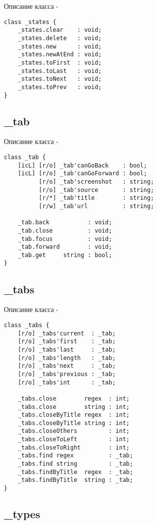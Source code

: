 \noindent Описание класса  -
\begin{lstlisting}[numbers=none]
class _states {
	_states.clear    : void;
	_states.delete   : void;
	_states.new      : void;
	_states.newAtEnd : void;
	_states.toFirst  : void;
	_states.toLast   : void;
	_states.toNext   : void;
	_states.toPrev   : void;
}
\end{lstlisting}

\subsection{{\color{orange} \_tab}}

\noindent Описание класса  -
\begin{lstlisting}[numbers=none]
class _tab {
	[icL] [r/o] _tab'canGoBack    : bool;
	[icL] [r/o] _tab'canGoForward : bool;
	      [r/o] _tab'screenshot   : string;
	      [r/o] _tab'source       : string;
	      [r/*] _tab'title        : string;
	      [r/w] _tab'url          : string;

	_tab.back           : void;
	_tab.close          : void;
	_tab.focus          : void;
	_tab.forward        : void;
	_tab.get     string : bool;
}
\end{lstlisting}

\subsection{{\color{orange} \_tabs}}

\noindent Описание класса  -
\begin{lstlisting}[numbers=none]
class _tabs {
	[r/o] _tabs'current  : _tab;
	[r/o] _tabs'first    : _tab;
	[r/o] _tabs'last     : _tab;
	[r/o] _tabs'length   : _tab;
	[r/o] _tabs'next     : _tab;
	[r/o] _tabs'previous : _tab;
	[r/o] _tabs'int      : _tab;
	
	_tabs.close        regex  : int;
	_tabs.close        string : int;
	_tabs.closeByTitle regex  : int;
	_tabs.closeByTitle string : int;
	_tabs.closeOthers         : int;
	_tabs.closeToLeft         : int;
	_tabs.closeToRight        : int;
	_tabs.find regex          : _tab;
	_tabs.find string         : _tab;
	_tabs.findByTitle  regex  : _tab;
	_tabs.findByTitle  string : _tab;
}
\end{lstlisting}

\subsection{{\color{orange} \_types}}

